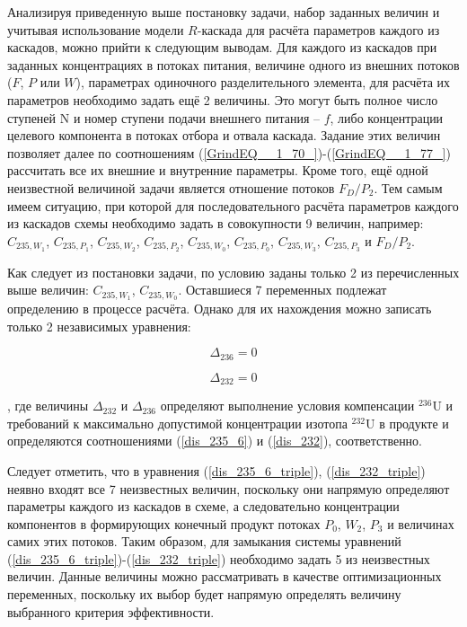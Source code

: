 Анализируя приведенную выше постановку задачи, набор заданных величин и учитывая использование модели $R$-каскада для расчёта параметров каждого из каскадов, можно прийти к следующим выводам. Для каждого из каскадов при заданных концентрациях в потоках питания, величине одного из внешних потоков ($F$, $P$ или $W$), параметрах одиночного разделительного элемента, для расчёта их параметров необходимо задать ещё 2 величины. Это могут быть полное число ступеней N и номер ступени подачи внешнего питания -- $f$, либо концентрации целевого компонента в потоках отбора и отвала каскада. Задание этих величин позволяет далее по соотношениям (\ref{GrindEQ__1_70_})-(\ref{GrindEQ__1_77_}) рассчитать все их внешние и внутренние параметры. Кроме того, ещё одной неизвестной величиной задачи является отношение потоков ${F_{D}}/{P_2}$.  Тем самым имеем ситуацию, при которой для последовательного расчёта параметров каждого из каскадов схемы необходимо задать в совокупности 9 величин, например: $C_{235,{W_1}}$, $C_{235,{P_1}}$, $C_{235,{W_2}}$, $C_{235,{P_2}}$, $C_{235,{W_0}}$, $C_{235,{P_0}}$, $C_{235,{W_3}}$, $C_{235,{P_3}}$ и ${F_{D}}/{P_2}$. 

Как следует из постановки задачи, по условию заданы только 2 из перечисленных выше величин: $C_{235,{W_1}}$, $C_{235,{W_0}}$. Оставшиеся 7 переменных подлежат определению в процессе расчёта. Однако для их нахождения можно записать только 2 независимых уравнения:

\begin{equation}
    \label{dis_235_6_triple}
    \Delta_{236}=0
\end{equation}

\begin{equation}
    \label{dis_232_triple}
    \Delta_{232}=0
\end{equation}

, где величины $\Delta_{232}$ и $\Delta_{236}$ определяют выполнение условия компенсации $^{236}$U и требований к максимально допустимой концентрации изотопа $^{232}$U в продукте и определяются соотношениями (\ref{dis_235_6}) и (\ref{dis_232}), соответственно.

Следует отметить, что в уравнения (\ref{dis_235_6_triple}), (\ref{dis_232_triple}) неявно входят все 7 неизвестных величин, поскольку они напрямую определяют параметры каждого из каскадов в схеме, а следовательно концентрации компонентов в формирующих конечный продукт потоках $P_0$, $W_2$, $P_3$ и величинах самих этих потоков. Таким образом, для замыкания системы уравнений (\ref{dis_235_6_triple})-(\ref{dis_232_triple}) необходимо задать 5 из неизвестных величин. Данные величины можно рассматривать в качестве оптимизационных переменных, поскольку их выбор будет напрямую определять величину выбранного критерия эффективности.


